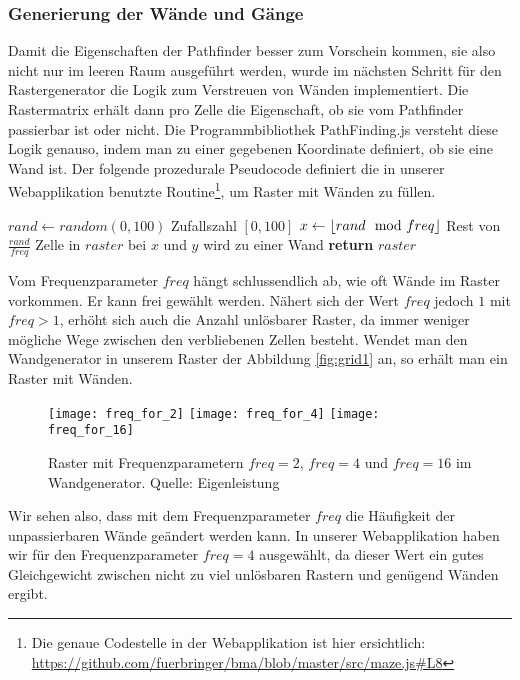 \subsubsection{Generierung der Wände und Gänge}
Damit die Eigenschaften der Pathfinder besser zum Vorschein kommen, sie also nicht nur im leeren Raum ausgeführt werden, wurde im nächsten Schritt für den Rastergenerator die Logik zum Verstreuen von Wänden implementiert. 
Die Rastermatrix erhält dann pro Zelle die Eigenschaft, ob sie vom Pathfinder passierbar ist oder nicht. 
Die Programmbibliothek PathFinding.js versteht diese Logik genauso, indem man zu einer gegebenen Koordinate definiert, ob sie eine Wand ist. 
Der folgende prozedurale Pseudocode definiert die in unserer Webapplikation benutzte Routine\footnote{Die genaue Codestelle in der Webapplikation ist hier ersichtlich: \url{https://github.com/fuerbringer/bma/blob/master/src/maze.js\#L8}}, um Raster mit Wänden zu füllen.
\begin{algorithmic}[1]
    \State $rand \gets random(0, 100)$ \Comment Zufallszahl $[0,100]$
    \State $x \gets \left\lfloor rand \mod freq \right\rfloor$ \Comment Rest von $\frac{rand}{freq}$
      \State Zelle in $raster$ bei $x$ und $y$ wird zu einer Wand
    \EndIf
    \EndFor
  \EndFor
  \State \textbf{return} $raster$
  \EndProcedure
\end{algorithmic}
Vom Frequenzparameter $freq$ hängt schlussendlich ab, wie oft Wände im Raster vorkommen. Er kann frei gewählt werden. Nähert sich der Wert $freq$ jedoch $1$ mit $freq > 1$, erhöht sich auch die Anzahl unlösbarer Raster, da immer weniger mögliche Wege zwischen den verbliebenen Zellen besteht.
Wendet man den Wandgenerator in unserem Raster der Abbildung \ref{fig:grid1} an, so erhält man ein Raster mit Wänden.
\begin{figure}[H]
  \centering
  \texttt{[image: freq\_for\_2]}
  \quad
  \texttt{[image: freq\_for\_4]}
  \quad
  \texttt{[image: freq\_for\_16]}\\
  \caption[Raster mit Frequenzparametern $freq = 2$, $freq = 4$ und $freq = 16$ im Wandgenerator.]{Raster mit Frequenzparametern $freq = 2$, $freq = 4$ und $freq = 16$ im Wandgenerator. Quelle: Eigenleistung}
  \label{fig:freq_param}
\end{figure}
Wir sehen also, dass mit dem Frequenzparameter $freq$ die Häufigkeit der unpassierbaren Wände geändert werden kann. In unserer Webapplikation haben wir für den Frequenzparameter $freq = 4$ ausgewählt, da dieser Wert ein gutes Gleichgewicht zwischen nicht zu viel unlösbaren Rastern und genügend Wänden ergibt.
